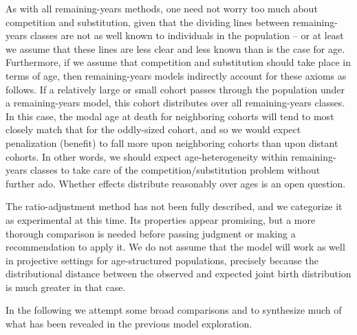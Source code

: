 As with all remaining-years methods, one need not worry too much about
competition and substitution, given that the dividing lines between
remaining-years classes are not as well known to individuals in the population
-- or at least we assume that these lines are less clear and less known than is the case
for age. Furthermore, if we assume that competition and substitution should take
place in terms of age, then remaining-years models indirectly account for
these axioms as follows. If a relatively large or small cohort passes through 
the population under a remaining-years model, this cohort distributes over
all remaining-years classes. In this case, the modal age at death for neighboring
cohorts will tend to most closely match that for the oddly-sized cohort, and so
we would expect penalization (benefit) to fall more upon neighboring cohorts
than upon distant cohorts. In other words, we should expect age-heterogeneity
within remaining-years classes to take care of the competition/substitution
problem without further ado. Whether effects distribute reasonably over ages is
an open question.

The ratio-adjustment method has not been fully described, and we categorize it
as experimental at this time. Its properties appear promising, but
a more thorough comparison is needed before passing judgment or making a
recommendation to apply it. We do not assume that the model will work as well in
projective settings for age-structured populations, precisely because the
distributional distance between the observed and expected joint birth
distribution is much greater in that case.

In the following we attempt some broad comparisons and to synthesize much
of what has been revealed in the previous model exploration.
\FloatBarrier


